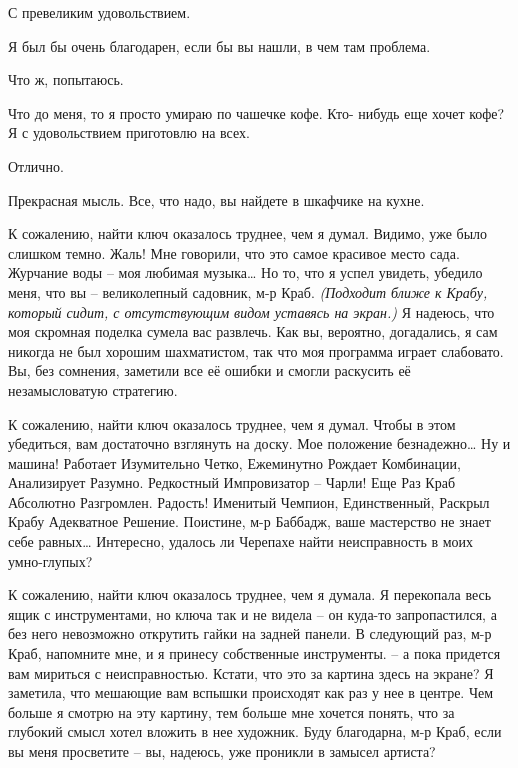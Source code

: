 \documentclass[../main.tex]{subfiles}
\begin{document}
\begin{dialogue}
 С превеликим удовольствием.

 Я был бы очень благодарен, если бы вы нашли, в чем там проблема.

 Что ж, попытаюсь.

 Что до меня, то я просто умираю по чашечке кофе. Кто- нибудь еще хочет кофе? Я с удовольствием приготовлю на всех.

 Отлично.

 Прекрасная мысль. Все, что надо, вы найдете в шкафчике на кухне.


 К сожалению, найти ключ оказалось труднее, чем я думал. Видимо, уже было слишком темно. Жаль! Мне говорили, что это самое красивое место сада. Журчание воды \--- моя любимая музыка\ldots{} Но то, что я успел увидеть, убедило меня, что вы \--- великолепный садовник, м-р Краб. \emph{(Подходит ближе к Крабу, который сидит, с отсутствующим видом уставясь на экран.)} Я надеюсь, что моя скромная поделка сумела вас развлечь. Как вы, вероятно, догадались, я сам никогда не был хорошим шахматистом, так что моя программа играет слабовато. Вы, без сомнения, заметили все её ошибки и смогли раскусить её незамысловатую стратегию.

 К сожалению, найти ключ оказалось труднее, чем я думал. Чтобы в этом убедиться, вам достаточно взглянуть на доску. Мое положение безнадежно\ldots{} Ну и машина! Работает Изумительно Четко, Ежеминутно Рождает Комбинации, Анализирует Разумно. Редкостный Импровизатор \--- Чарли! Еще Раз Краб Абсолютно Разгромлен. Радость! Именитый Чемпион, Единственный, Раскрыл Крабу Адекватное Решение. Поистине, м-р Баббадж, ваше мастерство не знает себе равных\ldots{} Интересно, удалось ли Черепахе найти неисправность в моих умно-глупых?

 К сожалению, найти ключ оказалось труднее, чем я думала. Я перекопала весь ящик с инструментами, но ключа так и не видела \--- он куда-то запропастился, а без него невозможно открутить гайки на задней панели. В следующий раз, м-р Краб, напомните мне, и я принесу собственные инструменты. \--- а пока придется вам мириться с неисправностью. Кстати, что это за картина здесь на экране? Я заметила, что мешающие вам вспышки происходят как раз у нее в центре. Чем больше я смотрю на эту картину, тем больше мне хочется понять, что за глубокий смысл хотел вложить в нее художник. Буду благодарна, м-р Краб, если вы меня просветите \--- вы, надеюсь, уже проникли в замысел артиста?


\end{dialogue}
\end{document}
